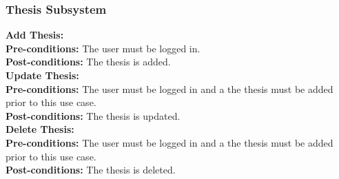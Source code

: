\documentclass{article}
\begin{document}
		\subsubsection{Thesis Subsystem}
			\textbf{Add Thesis:}\\
			\indent \textbf{Pre-conditions:} The user must be logged in.\\
			\indent \textbf{Post-conditions:} The thesis is added.\\
			\textbf{Update Thesis:}\\
			\indent \textbf{Pre-conditions:} The user must be logged in and a the thesis must be added prior to this use case.\\
			\indent \textbf{Post-conditions:} The thesis is updated.\\
			\textbf{Delete Thesis:}\\
			\indent \textbf{Pre-conditions:} The user must be logged in and a the thesis must be added prior to this use case.\\
			\indent \textbf{Post-conditions:} The thesis is deleted.\\
\end{document}
